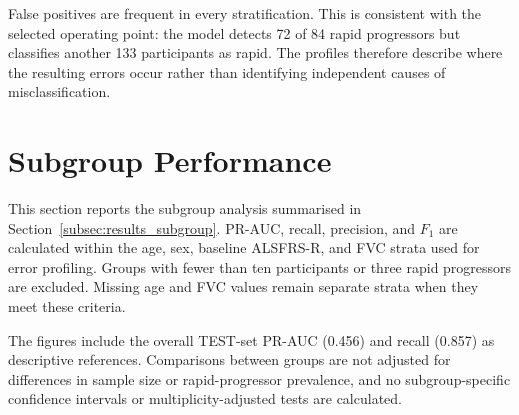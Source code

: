False positives are frequent in every stratification. This is consistent with the selected operating point: the model detects 72 of 84 rapid progressors but classifies another 133 participants as rapid. The profiles therefore describe where the resulting errors occur rather than identifying independent causes of misclassification.


\section{Subgroup Performance}
\label{app:subgroup_performance}

This section reports the subgroup analysis summarised in Section~\ref{subsec:results_subgroup}. \gls{PR-AUC}, recall, precision, and $F_1$ are calculated within the age, sex, baseline \gls{ALSFRS-R}, and \gls{FVC} strata used for error profiling. Groups with fewer than ten participants or three rapid progressors are excluded. Missing age and FVC values remain separate strata when they meet these criteria.

The figures include the overall \gls{TEST}-set PR-AUC (0.456) and recall (0.857) as descriptive references. Comparisons between groups are not adjusted for differences in sample size or rapid-progressor prevalence, and no subgroup-specific confidence intervals or multiplicity-adjusted tests are calculated.

